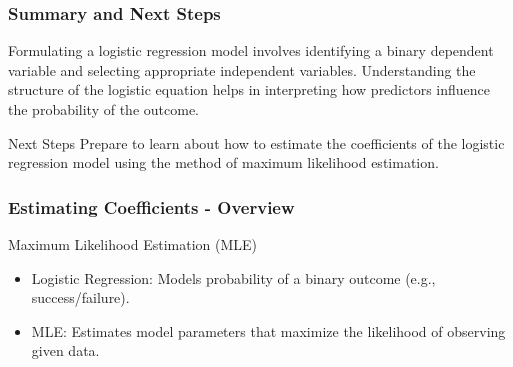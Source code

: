 \documentclass[aspectratio=169]{beamer}
\begin{document}
\begin{frame}[fragile]
    \frametitle{Summary and Next Steps}
    Formulating a logistic regression model involves identifying a binary dependent variable and selecting appropriate independent variables. Understanding the structure of the logistic equation helps in interpreting how predictors influence the probability of the outcome. 

    \begin{block}{Next Steps}
        Prepare to learn about how to estimate the coefficients of the logistic regression model using the method of maximum likelihood estimation.
    \end{block}
\end{frame}

\begin{frame}[fragile]
    \frametitle{Estimating Coefficients - Overview}
    \begin{block}{Maximum Likelihood Estimation (MLE)}
        \begin{itemize}
            \item Logistic Regression: Models probability of a binary outcome (e.g., success/failure).
            \item MLE: Estimates model parameters that maximize the likelihood of observing given data.
        \end{itemize}
    \end{block}
\end{frame}
\end{document}
